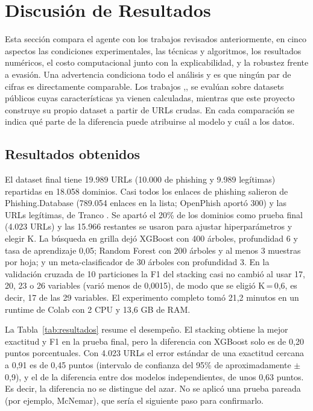 \section{Discusión de Resultados}

Esta sección compara el agente con los trabajos revisados anteriormente, en cinco aspectos las condiciones experimentales, las técnicas y algoritmos, los resultados numéricos, el costo computacional junto con la explicabilidad, y la robustez frente a evasión. Una advertencia condiciona todo el análisis y es que ningún par de cifras es directamente comparable. Los trabajos \cite{kalabarige2022multilayer},\cite{kalabarige2023boosting},\cite{alsariera2020ai} se evalúan sobre datasets públicos cuyas características ya vienen calculadas, mientras que este proyecto construye su propio dataset a partir de URLs crudas. En cada comparación se indica qué parte de la diferencia puede atribuirse al modelo y cuál a los datos.

\subsection{Resultados obtenidos}

El dataset final tiene 19.989 URLs (10.000 de phishing y 9.989 legítimas) repartidas en 18.058 dominios. Casi todos los enlaces de phishing salieron de Phishing.Database (789.054 enlaces en la lista; OpenPhish aportó 300) y las URLs legítimas, de Tranco \cite{lepochat2019tranco}. Se apartó el 20\% de los dominios como prueba final (4.023 URLs) y las 15.966 restantes se usaron para ajustar hiperparámetros y elegir K. La búsqueda en grilla dejó XGBoost con 400 árboles, profundidad 6 y tasa de aprendizaje 0,05; Random Forest con 200 árboles y al menos 3 muestras por hoja; y un meta-clasificador de 30 árboles con profundidad 3. En la validación cruzada de 10 particiones la F1 del stacking casi no cambió al usar 17, 20, 23 o 26 variables (varió menos de 0,0015), de modo que se eligió K\,=\,0,6, es decir, 17 de las 29 variables. El experimento completo tomó 21,2 minutos en un runtime de Colab con 2 CPU y 13,6 GB de RAM. \newline

La Tabla~\ref{tab:resultados} resume el desempeño. El stacking obtiene la mejor exactitud y F1 en la prueba final, pero la diferencia con XGBoost solo es de 0,20 puntos porcentuales. Con 4.023 URLs el error estándar de una exactitud cercana a 0,91 es de 0,45 puntos (intervalo de confianza del 95\% de aproximadamente $\pm$0,9), y el de la diferencia entre dos modelos independientes, de unos 0,63 puntos. Es decir, la diferencia no se distingue del azar. No se aplicó una prueba pareada (por ejemplo, McNemar), que sería el siguiente paso para confirmarlo.


